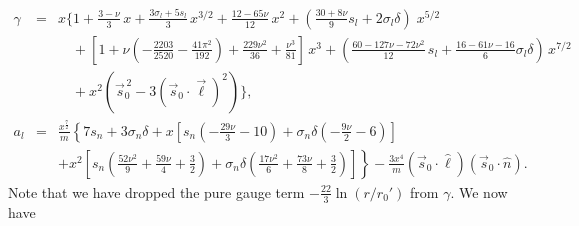 \documentclass[aps,prd,amsmath,floatfix,twocolumn,superscriptaddress,nofootinbib,showpacs]{revtex4-1}
\newcommand{\ellHat}{\ensuremath{\hat{\ell}}}
\newcommand{\nHat}{\ensuremath{\hat{n}}}
\begin{document}
\begin{widetext}
\begin{eqnarray}
  \gamma & = & x \bigg\{1 + \frac{3-\nu}{3}\,x
    +\frac{3\sigma_l+5s_l}{3}\,x^{3/2}
    + \frac{12-65\nu}{12}\,x^{2}
    + \left(\frac{30+8\nu}{9}s_l+2\sigma_l\delta\right)\;x^{5/2} \nonumber \\
  &&\quad 
    +\left[1 + \nu \left(- \frac{2203}{2520}-\frac{41 \pi^{2}}{192}\right) 
      + \frac{229 \nu^{2}}{36} + \frac{\nu^{3}}{81}\right]\,x^3
+ \left( \frac{60-127\nu-72\nu^2}{12}
\,s_{l} + 
\frac{16-61\nu-16}{6}%
\sigma_{l} \delta 
\right)\,x^{7/2}
\nonumber \\    
&& \quad +x^{2} \left(\vec{s}_{0}^{\,2} - 3 (\vec s_0\cdot\vec\ell)^{2}\right)\bigg\},
  \label{eq:gammaPN}\\
%
  a_l&=&  \frac{x^{\frac{7}{2}}}{m}
  \left\{7 s_{n} + 3 \sigma_{n} \delta +  x \left[s_{n} \left(- \frac{29
          \nu}{3} - 10\right) + \sigma_{n} \delta \left(- \frac{9
          \nu}{2} - 6\right)\right] \right. \nonumber \\
  && + \left. x^{2} \left[s_{n} \left(\frac{52
          \nu^{2}}{9} + \frac{59 \nu}{4} + \frac{3}{2}\right) +
      \sigma_{n} \delta \left(\frac{17 \nu^{2}}{6} + \frac{73 \nu}{8} +
        \frac{3}{2}\right)\right] \right\}- \frac{3x^{4}}{m} (\vec{s}_{0}\cdot\ellHat)(\vec{s}_{0}\cdot\nHat).
  \label{eq:al}
\end{eqnarray}
Note that we have dropped the pure gauge term
$-\frac{22}{3}\ln\left(r/r_{0}'\right)$ from $\gamma$.  We now have

\end{widetext}
\end{document}
